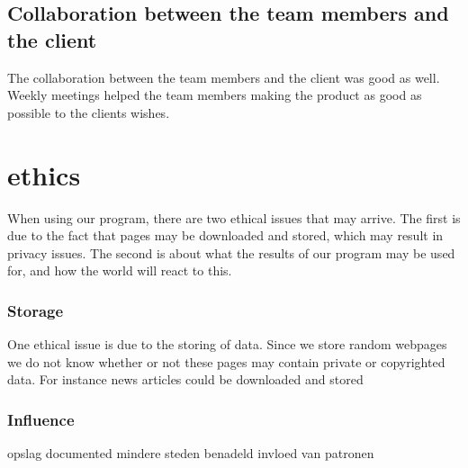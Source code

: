 \subsection{Collaboration between the team members and the client}
The collaboration between the team members and the client was good as well. 
Weekly meetings helped the team members making the product as good as possible to the clients wishes. 

\section{ethics}
When using our program, there are two ethical issues that may arrive. The first is due to the fact that pages may be downloaded and stored, which may result in privacy issues. The second is about what the results of our program may be used for, and how the world will react to this.

\subsubsection{Storage}
One ethical issue is due to the storing of data. Since we store random webpages we do not know whether or not these pages may contain private or copyrighted data. For instance news articles could be downloaded and stored

\subsubsection{Influence}

opslag documented
mindere steden benadeld
invloed van patronen
